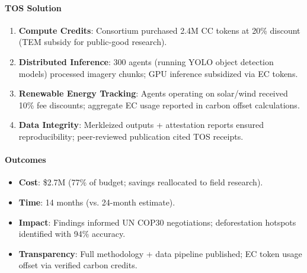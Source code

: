 \documentclass[11pt]{article}
\begin{document}
\paragraph{TOS Solution}
\begin{enumerate}[noitemsep]
  \item \textbf{Compute Credits}: Consortium purchased 2.4M CC tokens at 20\% discount (TEM subsidy for public-good research).
  \item \textbf{Distributed Inference}: 300 agents (running YOLO object detection models) processed imagery chunks; GPU inference subsidized via EC tokens.
  \item \textbf{Renewable Energy Tracking}: Agents operating on solar/wind received 10\% fee discounts; aggregate EC usage reported in carbon offset calculations.
  \item \textbf{Data Integrity}: Merkleized outputs + attestation reports ensured reproducibility; peer-reviewed publication cited TOS receipts.
\end{enumerate}

\paragraph{Outcomes}
\begin{itemize}[noitemsep]
  \item \textbf{Cost}: \$2.7M (77\% of budget; savings reallocated to field research).
  \item \textbf{Time}: 14 months (vs. 24-month estimate).
  \item \textbf{Impact}: Findings informed UN COP30 negotiations; deforestation hotspots identified with 94\% accuracy.
  \item \textbf{Transparency}: Full methodology + data pipeline published; EC token usage offset via verified carbon credits.
\end{itemize}
\end{document}
